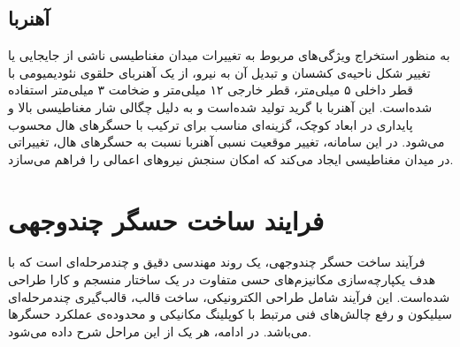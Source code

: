 \subsection{آهنربا}
به منظور استخراج ویژگی‌های مربوط به تغییرات میدان مغناطیسی ناشی از جایجایی یا تغییر شکل ناحیه‌ی کشسان و تبدیل آن به نیرو، از یک آهنربای حلقوی نئودیمیومی با قطر داخلی ۵ میلی‌متر، قطر خارجی ۱۲ میلی‌متر و ضخامت ۳ میلی‌متر استفاده شده‌است. این آهنربا با گرید  تولید شده‌است و به دلیل چگالی شار مغناطیسی بالا و پایداری در ابعاد کوچک، گزینه‌ای مناسب برای ترکیب با حسگرهای هال محسوب می‌شود. در این سامانه، تغییر موقعیت نسبی آهنربا نسبت به حسگرهای هال، تغییراتی در میدان مغناطیسی ایجاد می‌کند که امکان سنجش  نیروهای اعمالی را فراهم می‌سازد.



\section{فرایند ساخت حسگر چندوجهی}
فرآیند ساخت حسگر چندوجهی، یک روند مهندسی دقیق و چندمرحله‌ای است که با هدف یکپارچه‌سازی مکانیزم‌های حسی متفاوت در یک ساختار منسجم و کارا طراحی شده‌است. این فرآیند شامل طراحی الکترونیکی، ساخت قالب، قالب‌گیری چندمرحله‌ای سیلیکون و رفع چالش‌های فنی مرتبط با کوپلینگ مکانیکی و محدوده‌ی عملکرد حسگرها می‌باشد. در ادامه، هر یک از این مراحل شرح داده می‌شود.

